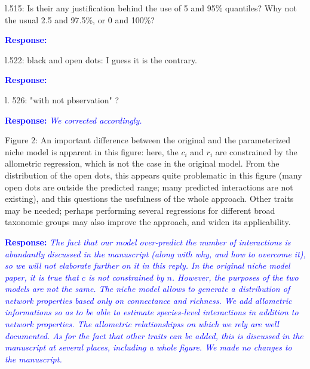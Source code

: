\documentclass [12pt,onecolumn,twoside,openright]{report}
\begin{document}
\begin{onehalfspacing}
\medskip l.515: Is their any justification behind the use of 5
and 95\% quantiles? Why not the usual 2.5 and 97.5\%, or 0 and 100\%?

\textcolor{blue}{\textbf{Response:}} \textit{\textcolor{blue}{}}

\medskip l.522: black and open dots: I guess it is the
contrary.

\textcolor{blue}{\textbf{Response:}} \textit{\textcolor{blue}{}}

\medskip l. 526: "with not pbservation" ?

\textcolor{blue}{\textbf{Response:}} \textit{\textcolor{blue}{We corrected
accordingly.}}

\medskip Figure 2: An important difference between the
original and the parameterized niche model is apparent in this figure: here, the
$c_i$ and $r_i$ are constrained by the allometric regression, which is not the
case in the original model. From the distribution of the open dots, this appears
quite problematic in this figure (many open dots are outside the predicted
range; many predicted interactions are not existing), and this questions the
usefulness of the whole approach. Other traits may be needed; perhaps performing
several regressions for different broad taxonomic groups may also improve the
approach, and widen its applicability.

\textcolor{blue}{\textbf{Response:}} \textit{\textcolor{blue}{The fact that our
model over-predict the number of interactions is abundantly discussed in the
manuscript (along with why, and how to overcome it), so we will not elaborate
further on it in this reply. In the original niche model paper, it is true
that $c$ is not constrained by $n$. However, the purposes of the two models are
not the same. The niche model allows to generate a distribution of network
properties based only on connectance and richness. We add allometric
informations so as to be able to estimate species-level interactions in addition
to network properties. The allometric relationshipss on which we rely are well
documented. As for the fact that other traits can be added, this is discussed in
the manuscript at several places, including a whole figure. We made no changes
to the manuscript.}}

\end{onehalfspacing}
\end{document}
